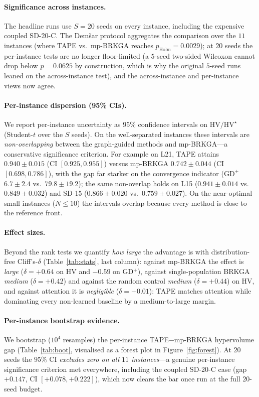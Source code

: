 \documentclass[11pt]{article}
\begin{document}
\paragraph{Significance across instances.} The headline runs use $S{=}20$ seeds on every
instance, including the expensive coupled \textsf{SD-20-C}. The Dem\v{s}ar protocol aggregates
the comparison over the $11$ instances (where TAPE vs.\ mp-BRKGA reaches $p_{\text{Holm}}=0.0029$);
at $20$ seeds the per-instance tests are no longer floor-limited (a $5$-seed two-sided Wilcoxon
cannot drop below $p=0.0625$ by construction, which is why the original $5$-seed runs leaned on
the across-instance test), and the across-instance and per-instance views now agree.

\paragraph{Per-instance dispersion (95\% CIs).} We report per-instance uncertainty as
$95\%$ confidence intervals on $\mathrm{HV}/\mathrm{HV}^\star$ (Student-$t$ over the $S$
seeds). On the well-separated instances these intervals are \emph{non-overlapping} between
the graph-guided methods and mp-BRKGA---a conservative significance criterion. For example
on \textsf{L21}, TAPE attains $0.940\pm0.015$ (CI $[0.925,0.955]$) versus mp-BRKGA
$0.742\pm0.044$ (CI $[0.698,0.786]$), with the gap far starker on the convergence indicator
($\mathrm{GD}^+$ $6.7\pm2.4$ vs.\ $79.8\pm19.2$); the same non-overlap holds on
\textsf{L15} ($0.941\pm0.014$ vs.\ $0.849\pm0.032$) and \textsf{SD-15}
($0.866\pm0.020$ vs.\ $0.759\pm0.027$). On the near-optimal small instances ($N\le10$) the
intervals overlap because every method is close to the reference front.

\paragraph{Effect sizes.} Beyond the rank tests we quantify \emph{how large} the advantage
is with distribution-free Cliff's-$\delta$ (Table~\ref{tab:stats}, last column): against
mp-BRKGA the effect is \emph{large} ($\delta=+0.64$ on HV and $-0.59$ on GD$^+$), against
single-population BRKGA \emph{medium} ($\delta=+0.42$) and against the random control
\emph{medium} ($\delta=+0.44$) on HV, and against attention it is \emph{negligible}
($\delta=+0.01$): TAPE matches attention while dominating every non-learned baseline by a
medium-to-large margin.

\paragraph{Per-instance bootstrap evidence.} We bootstrap ($10^{4}$ resamples) the
per-instance TAPE$-$mp-BRKGA hypervolume gap (Table~\ref{tab:boot}, visualised as a forest
plot in Figure~\ref{fig:forest}). At $20$ seeds the $95\%$ CI \emph{excludes zero on all $11$
instances}---a genuine per-instance significance criterion met everywhere, including the
coupled \textsf{SD-20-C} case (gap $+0.147$, CI $[+0.078,+0.222]$), which now clears the bar
once run at the full $20$-seed budget.
\end{document}

